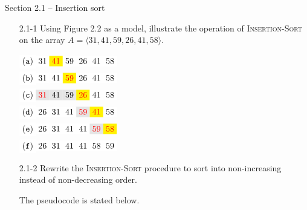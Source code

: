 
{\large Section 2.1 {--} Insertion sort}

\begin{enumerate}

\item[2.1{-}1]{Using Figure 2.2 as a model, illustrate the operation of
  \textsc{Insertion-Sort} on the array $A = \langle 31, 41, 59, 26, 41, 58 \rangle$.}

\begin{framed}
{\centering $ \displaystyle
\begin{aligned}
  \colorbox{white}{(\texttt{a})} \colorbox{white}{31} \colorbox{yellow}{\textcolor{red}{41}}
  \colorbox{white}{59} \colorbox{white}{26} \colorbox{white}{41} \colorbox{white}{58}\\
%
  \colorbox{white}{(\texttt{b})} \colorbox{white}{31} \colorbox{white}{41} \colorbox{yellow}{\textcolor{red}{59}}
  \colorbox{white}{26} \colorbox{white}{41} \colorbox{white}{58}\\
%
  \colorbox{white}{(\texttt{c})} \colorbox{gray!20}{\textcolor{red}{31}} \colorbox{gray!20}{41} \colorbox{gray!20}{59}
  \colorbox{yellow}{\textcolor{red}{26}} \colorbox{white}{41} \colorbox{white}{58}\\
%
  \colorbox{white}{(\texttt{d})} \colorbox{white}{26} \colorbox{white}{31} \colorbox{white}{41}
  \colorbox{gray!20}{\textcolor{red}{59}} \colorbox{yellow}{\textcolor{red}{41}} \colorbox{white}{58}\\
%
  \colorbox{white}{(\texttt{e})} \colorbox{white}{26} \colorbox{white}{31} \colorbox{white}{41}
  \colorbox{white}{41} \colorbox{gray!20}{\textcolor{red}{59}} \colorbox{yellow}{\textcolor{red}{58}}\\
%
  \colorbox{white}{(\texttt{f})} \colorbox{white}{26} \colorbox{white}{31} \colorbox{white}{41}
  \colorbox{white}{41} \colorbox{white}{58} \colorbox{white}{59}\\
\end{aligned} $ \par} %
\end{framed}

\item[2.1{-}2]{Rewrite the \textsc{Insertion-Sort} procedure to sort into
  non-increasing instead of non-decreasing order.}


\begin{framed}
The pseudocode is stated below.\\
\begin{algorithm}[H]
\SetAlgoNoEnd\DontPrintSemicolon
\BlankLine
{}
\end{algorithm}
\end{framed}


\end{enumerate}
